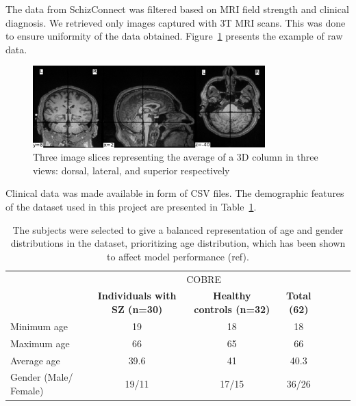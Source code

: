 The data from SchizConnect was filtered based on MRI field strength and clinical diagnosis. We retrieved only images captured with 3T MRI scans. This was done to ensure uniformity of the data obtained. Figure~\ref{fig:raw_mri_volume_slices} presents the example of raw data.
\begin{figure}[h]
    \centering
    \includegraphics[width=0.8\textwidth]{./figs/sample_volume.png} %
    \caption{Three image slices representing the average of a 3D column in three views: dorsal, lateral, and superior respectively}\label{fig:raw_mri_volume_slices}
\end{figure}

Clinical data was made available in form of CSV files. The demographic features of the dataset used in this project are presented in Table~\ref{tab:cobre_clinical_demographic}.
\begin{center}
	\begin{table}
        \centering
        \caption{\label{tab:cobre_clinical_demographic}The subjects were selected to give a balanced representation of age and gender distributions in the dataset, prioritizing age distribution, which has been shown to affect model performance (ref).}
        \begin{tabular*}{500pt}{@{\extracolsep\fill}lcccccc@{\extracolsep\fill}}
            \toprule
            & \multicolumn{3}{c}{COBRE}
            \\\cmidrule{2-4}
            & \textbf{Individuals with SZ (n=30)} & \textbf{Healthy controls (n=32)} & \textbf{Total (62)} \\
            \midrule
            Minimum age             & 19  & 18  & 18 \\
            Maximum age 		    & 66  & 65 & 66  \\
            Average age             & 39.6 & 41 & 40.3	\\
            Gender (Male/ Female)   & 19/11 & 17/15 & 36/26	\\
            \bottomrule
        \end{tabular*}
    \end{table}    
\end{center}

